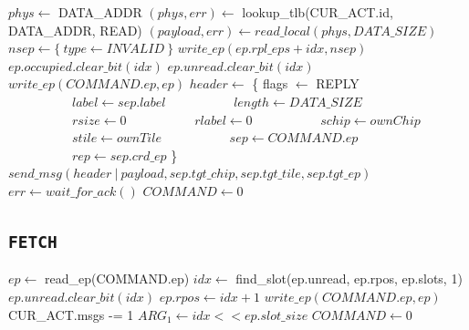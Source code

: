 \begin{algorithm}
    \setcounter{AlgoLine}{27}
    $phys \gets$ DATA\_ADDR\;
    $(phys, err) \gets$ lookup\_tlb(\colorbox{tilemux}{CUR\_ACT.id, }DATA\_ADDR, READ)\;
    \extend{}
    \BlankLine
    $(payload, err) \gets read\_local(phys, DATA\_SIZE)$\;
    \extend{}
    \BlankLine
    $nsep \gets \{~type \gets INVALID~\}$\;
    $write\_ep(ep.rpl\_eps + idx, nsep)$\;
    \BlankLine
    \extend{}
    \BlankLine
    $ep.occupied.clear\_bit(idx)$\;
    $ep.unread.clear\_bit(idx)$\;
    $write\_ep(COMMAND.ep, ep)$\;
    \BlankLine
    $header \gets$ \{ flags $\gets$ REPLY\;
    $\quad\quad\quad\quad\quad label \gets sep.label$\;
    $\quad\quad\quad\quad\quad length \gets DATA\_SIZE$\;
    $\quad\quad\quad\quad\quad rsize \gets 0$\;
    $\quad\quad\quad\quad\quad rlabel \gets 0$\;
    $\quad\quad\quad\quad\quad schip \gets ownChip$\;
    $\quad\quad\quad\quad\quad stile \gets ownTile$\;
    $\quad\quad\quad\quad\quad sep \gets COMMAND.ep$\;
    $\quad\quad\quad\quad\quad rep \gets sep.crd\_ep$ \}\;
    $send\_msg(header\ |\ payload, sep.tgt\_chip, sep.tgt\_tile, sep.tgt\_ep)$\;
    $err \gets wait\_for\_ack()$\;
    \BlankLine
    $COMMAND \gets 0$\;
    \caption{The TCU's \texttt{REPLY} command (continued).}
\end{algorithm}

\subsection{\texttt{FETCH}}

\begin{algorithm}[H]
    $ep \gets$ read\_ep(COMMAND.ep)\;
    \extend{}
    \BlankLine
    $idx \gets$ find\_slot(ep.unread, ep.rpos, ep.slots, 1)\;
    $ep.unread.clear\_bit(idx)$\;
    $ep.rpos \gets idx + 1$\;
    $write\_ep(COMMAND.ep, ep)$\;
    \BlankLine
    CUR\_ACT.msgs -= 1\;
    \extend{}
    \BlankLine
    $ARG_1 \gets idx << ep.slot\_size$\;
    $COMMAND \gets 0$\;
    \caption{The TCU's \texttt{FETCH} command.}
\end{algorithm}

